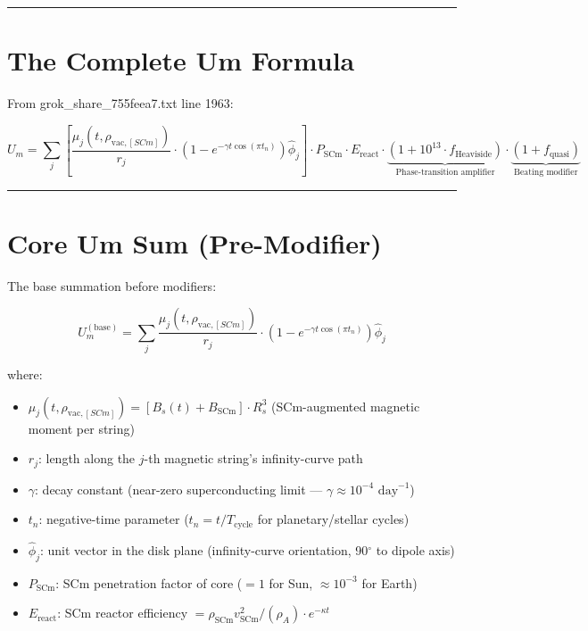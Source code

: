 \documentclass[12pt,a4paper]{article}
\begin{document}
\medskip\hrule\medskip

\section{The Complete Um Formula}

From grok\_{share\_755feea7}.txt line 1963:

\begin{equation}
\boxed{U_m = \sum_j \left[\frac{\mu_j(t,\rho_{\text{vac},[SCm]})}{r_j} \cdot \left(1 - e^{-\gamma t \cos(\pi t_n)}\right) \hat{\phi}_j\right] \cdot P_{\text{SCm}} \cdot E_{\text{react}} \cdot \underbrace{\left(1 + 10^{13} \cdot f_{\text{Heaviside}}\right)}_{\text{Phase-transition amplifier}} \cdot \underbrace{\left(1 + f_{\text{quasi}}\right)}_{\text{Beating modifier}}}
\end{equation}

\medskip\hrule\medskip

\section{Core Um Sum (Pre-Modifier)}

The base summation before modifiers:

\begin{equation}
U_m^{(\text{base})} = \sum_j \frac{\mu_j(t,\rho_{\text{vac},[SCm]})}{r_j} \cdot \left(1 - e^{-\gamma t \cos(\pi t_n)}\right) \hat{\phi}_j
\end{equation}

where:

\begin{itemize}
  \item $\mu_j(t,\rho_{\text{vac},[SCm]}) = \left[B_s(t) + B_{\text{SCm}}\right] \cdot R_s^3$ (SCm-augmented magnetic moment per string)
  \item $r_j$: length along the $j$-th magnetic string's infinity-curve path
  \item $\gamma$: decay constant (near-zero superconducting limit --- $\gamma \approx 10^{-4}$ $\mathrm{day}^{-1}$)
  \item $t_n$: negative-time parameter ($t_n = t/T_{\text{cycle}}$ for planetary/stellar cycles)
  \item $\hat{\phi}_j$: unit vector in the disk plane (infinity-curve orientation, 90$^{\circ}$ to dipole axis)
  \item $P_{\text{SCm}}$: SCm penetration factor of core ($=1$ for Sun, $\approx 10^{-3}$ for Earth)
  \item $E_{\text{react}}$: SCm reactor efficiency $= \rho_{\text{SCm}} v_{\text{SCm}}^2 / (\rho_A) \cdot e^{-\kappa t}$
\end{itemize}
\end{document}

